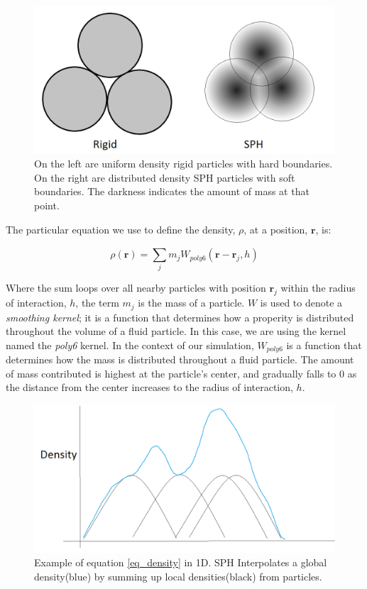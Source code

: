 \documentclass[]{article}
\begin{document}
	\begin{figure}[ht]
	  \centering
	  \includegraphics[width=6.0in]{images/RigidSPH}
	  \caption{On the left are uniform density rigid particles with hard boundaries. On the right are distributed density 
		SPH particles with soft boundaries. The darkness indicates the amount of mass at that point.}
	\end{figure}
	
	The particular equation we use to define the density, \(\rho\), at a position, \( \mathbf{r} \),  is:
	
	\begin{equation}
		\label{eq_density}
		\rho (\mathbf{r}) = \sum_{j}^{} m_j W_{poly6}(\mathbf{r} - \mathbf{r}_j, h)
	\end{equation}
	
	Where the sum loops over all nearby particles with position \( \mathbf{r}_j \) within the radius of interaction, 
	\( h \), the term \( m_j \) is the mass of a particle. \( W \) is used to denote a \textit{smoothing kernel}; it is
	a function that determines how a properity is distributed throughout the volume of a fluid particle. In this case, we
	are using the kernel named the \textit{poly6} kernel. In the context of our simulation, \( W_{poly6} \) is a function 
	that determines how the mass is distributed throughout a fluid particle. The amount of mass contributed is highest at 
	the particle's center, and gradually falls to 0 as the distance from the center increases to the radius of interaction, 
	\( h\).\\
	
	\begin{figure}[ht]
		\centering
		\includegraphics[width=6.0in]{images/SPHSum}
		\caption{Example of equation \ref{eq_density} in 1D. SPH Interpolates a global density(blue) by summing up local
		 densities(black) from particles.}
	\end{figure}
	
\end{document}
